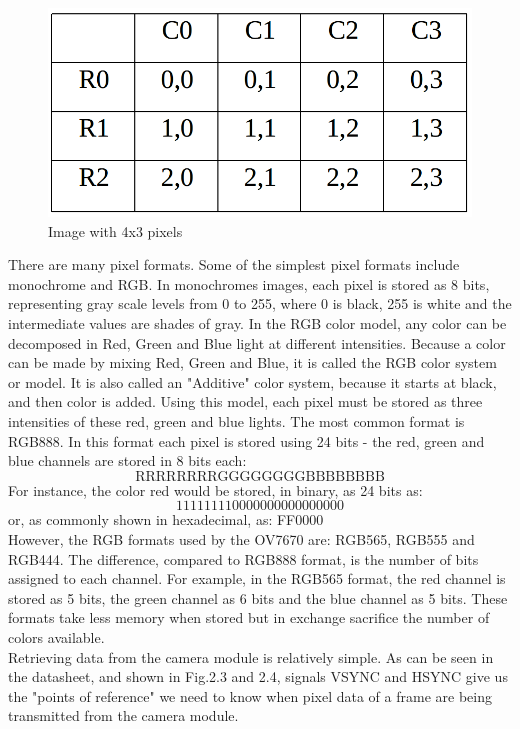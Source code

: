 \documentclass[a4paper]{article}
\begin{document}
\begin{figure}[H]
    \centering
    \includegraphics[scale=0.25]{images/column.png}
    \caption{Image with 4x3 pixels}
    \label{fig:my_label}
\end{figure}
There are many pixel formats. Some of the simplest pixel formats include monochrome and RGB. In monochromes images, each pixel is stored as 8 bits, representing gray scale levels from 0 to 255, where 0 is black, 255 is white and the intermediate values are shades of gray. In the RGB color model, any color can be decomposed in Red, Green and Blue light at different intensities. Because a color can be made by mixing Red, Green and Blue, it is called the RGB color system or model. It is also called an "Additive" color system, because it starts at black, and then color is added. Using this model, each pixel must be stored as three intensities of these red, green and blue lights. The most common format is RGB888. In this format each pixel is stored using 24 bits - the red, green and blue channels are stored in 8 bits each:
$$\text{RRRRRRRRGGGGGGGGBBBBBBBB}$$
For instance, the color red would be stored, in binary, as 24 bits as:
$$\text{111111110000000000000000}$$
or, as commonly shown in hexadecimal, as: FF0000\\
However, the RGB formats used by the OV7670 are: RGB565, RGB555 and RGB444. The difference, compared to RGB888 format, is the number of bits assigned to each channel. For example, in the RGB565 format, the red channel is stored as 5 bits, the green channel as 6 bits and the blue channel as 5 bits. These formats take less memory when stored but in exchange sacrifice the number of colors available.\\
Retrieving data from the camera module is relatively simple. As can be seen in the datasheet, and shown in Fig.2.3 and 2.4, signals VSYNC and HSYNC give us the "points of reference" we need to know when pixel data of a frame are being transmitted from the camera module.
\end{document}
